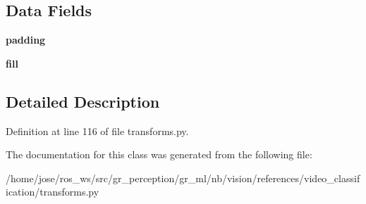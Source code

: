 \subsection*{Data Fields}
\begin{DoxyCompactItemize}
\item 
\mbox{\label{classtransforms_1_1Pad_a52cbc62b47882c96b8b7f09520bc5dce}} 
{\bfseries padding}
\item 
\mbox{\label{classtransforms_1_1Pad_abab3dee9ee8b239fa52844b2a9658f31}} 
{\bfseries fill}
\end{DoxyCompactItemize}


\subsection{Detailed Description}


Definition at line 116 of file transforms.\+py.



The documentation for this class was generated from the following file\+:\begin{DoxyCompactItemize}
\item 
/home/jose/ros\+\_\+ws/src/gr\+\_\+perception/gr\+\_\+ml/nb/vision/references/video\+\_\+classification/transforms.\+py\end{DoxyCompactItemize}
